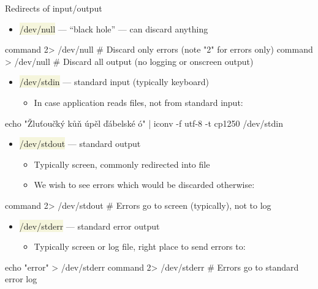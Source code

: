 \documentclass[compress, xelatex, 11pt, xcolor=svgnames, aspectratio=169,
	hyperref={
		bookmarks=true,
		unicode=true,
		colorlinks=true,
		pdftitle={Linux, command line and MetaCentrum},
		plainpages=false,
		pdfauthor={Vojtech Zeisek},
		pdfsubject={Course about use of Linux command line, writing shell scripts and using MetaCentrum of CESNET},
		pdfcreator={XeLaTeX},
		pdfkeywords={Linux, GNU, BASH, shell, command line, MetaCentrum},
		linkcolor=DarkRed, %
		anchorcolor=DarkBlue, %
		citecolor=Indigo, %
		filecolor=NavyBlue, %
		menucolor=DarkMagenta, %
		urlcolor=DarkBlue, %
		},
	url={hyphens, lowtilde} %
	]{beamer}
\renewcommand{\texttt}[1]{\colorbox{Beige}{{\ttfamily #1}}}
\begin{document}
\begin{frame}[fragile]{Redirects of input/output}
	\label{pipe}
	\begin{itemize}
		\item \texttt{/dev/null} --- \enquote{black hole} --- can discard anything
	\end{itemize}
	\begin{bashcode}
    command 2> /dev/null # Discard only errors (note "2" for errors only)
    command > /dev/null # Discard all output (no logging or onscreen output)
	\end{bashcode}
	\begin{itemize}
		\item \texttt{/dev/stdin} --- standard input (typically keyboard)
		\begin{itemize}
			\item In case application reads files, not from standard input:
		\end{itemize}
	\end{itemize}
	\begin{bashcode}
    echo "Žluťoučký kůň úpěl ďábelské ó" | iconv -f utf-8 -t cp1250 /dev/stdin
	\end{bashcode}
	\begin{itemize}
		\item \texttt{/dev/stdout} --- standard output
		\begin{itemize}
			\item Typically screen, commonly redirected into file
			\item We wish to see errors which would be discarded otherwise:
		\end{itemize}
	\end{itemize}
	\begin{bashcode}
    command 2> /dev/stdout # Errors go to screen (typically), not to log
	\end{bashcode}
	\begin{itemize}
		\item \texttt{/dev/stderr} --- standard error output
		\begin{itemize}
			\item Typically screen or log file, right place to send errors to:
		\end{itemize}
	\end{itemize}
	\begin{bashcode}
    echo "error" > /dev/stderr
    command 2> /dev/stderr # Errors go to standard error log
	\end{bashcode}
\end{frame}
\end{document}
